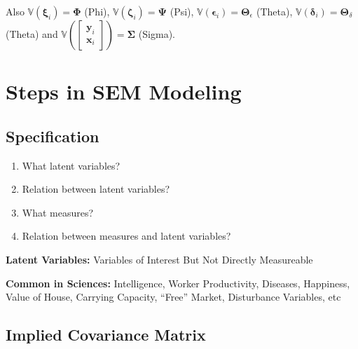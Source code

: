 Also \(\mathbb{V}\left(\bm{\xi}_{i}\right)=\bm{\Phi}\) (Phi), \(\mathbb{V}\left(\bm{\zeta}_{i}\right)=\bm{\Psi}\)
(Psi), \(\mathbb{V}\left(\bm{\epsilon}_{i}\right)=\bm{\Theta}_{\epsilon}\)
(Theta), \(\mathbb{V}\left(\bm{\delta}_{i}\right)=\bm{\Theta}_{\delta}\)
(Theta) and \(\mathbb{V}\left(\begin{bmatrix}\mathbf{y}_{i}\\ \mathbf{x}_{i} \end{bmatrix}\right)=\bm{\Sigma}\) (Sigma).

\section{Steps in SEM Modeling}

\subsection{Specification}

\begin{enumerate}
\item What latent variables?
\item Relation between latent variables?
\item What measures?
\item Relation between measures and latent variables?
\end{enumerate}

\textbf{Latent Variables:} Variables of Interest But Not Directly Measureable

\textbf{Common in Sciences:} Intelligence, Worker Productivity, Diseases,
Happiness, Value of House, Carrying Capacity, ``Free'' Market, Disturbance
Variables, etc


\subsection{Implied Covariance Matrix}

